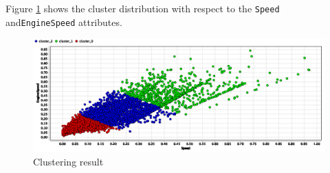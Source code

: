 Figure \ref{figure:clusters} shows the cluster distribution with respect to the \texttt{Speed} and\newline \texttt{EngineSpeed} attributes.

\begin{figure}[h!]
\centerline{\includegraphics[width=\textwidth]{images/cluster_distrib.png}}
\caption{Clustering result}
\label{figure:clusters}
\end{figure}

